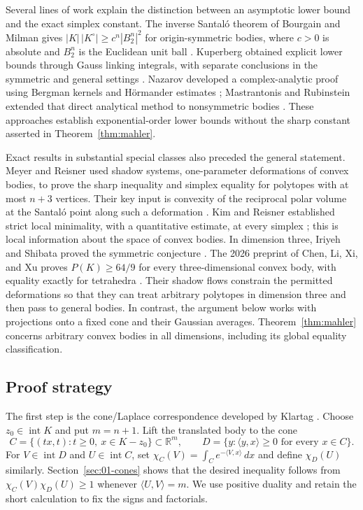 Several lines of work explain the distinction between an asymptotic lower
bound and the exact simplex constant. The inverse Santal\'o theorem of
Bourgain and Milman gives
$|K|\,|K^\circ|\ge c^n|B_2^n|^2$ for origin-symmetric bodies, where $c>0$ is
absolute and $B_2^n$ is the Euclidean unit ball
\cite{BourgainMilman1987}. Kuperberg obtained explicit lower bounds through
Gauss linking integrals, with separate conclusions in the symmetric and
general settings \cite{Kuperberg2008}. Nazarov developed a complex-analytic
proof using Bergman kernels and H\"ormander estimates
\cite{Nazarov2012}; Mastrantonis and Rubinstein extended that direct
analytical method to nonsymmetric bodies \cite{MastrantonisRubinstein2024}.
These approaches establish exponential-order lower bounds without the
sharp constant asserted in Theorem~\ref{thm:mahler}.

Exact results in substantial special classes also preceded the general
statement. Meyer and Reisner used shadow systems, one-parameter
deformations of convex bodies, to prove the sharp inequality and simplex
equality for polytopes with at most $n+3$ vertices. Their key input is
convexity of the reciprocal polar volume at the Santal\'o point along
such a deformation \cite[Theorems~1 and~10]{MeyerReisner2006}.
Kim and Reisner established strict
local minimality, with a quantitative estimate, at every simplex
\cite[Theorem~1]{KimReisner2011}; this is local information about the
space of convex bodies. In dimension three, Iriyeh and Shibata proved the
symmetric conjecture \cite{IriyehShibata2020}. The 2026 preprint of Chen,
Li, Xi, and Xu proves $P(K)\ge64/9$ for every three-dimensional
convex body, with equality exactly for tetrahedra
\cite{ChenLiXiXu2026}. Their shadow flows constrain the permitted
deformations so that they can treat arbitrary polytopes in dimension
three and then pass to general bodies. In contrast, the argument below
works with projections onto a fixed cone and their Gaussian averages.
Theorem~\ref{thm:mahler} concerns arbitrary convex bodies in all
dimensions, including its global equality classification.

\subsection*{Proof strategy}
The first step is the cone/Laplace correspondence developed by Klartag
\cite[Lemma~2.1 and Corollary~4.1]{Klartag2018}. Choose
$z_0\in\operatorname{int}K$ and put $m=n+1$. Lift the translated body
to the cone
\[
 C=\{(tx,t):t\ge0,\ x\in K-z_0\}\subset\mathbb R^m,
 \qquad D=\{y:\langle y,x\rangle\ge0\text{ for every }x\in C\}.
\]
For $V\in\operatorname{int}D$ and $U\in\operatorname{int}C$, set
$\chi_C(V)=\int_Ce^{-\langle V,x\rangle}\,dx$ and define $\chi_D(U)$
similarly. Section~\ref{sec:01-cones} shows that the desired inequality
follows from $\chi_C(V)\chi_D(U)\ge1$ whenever
$\langle U,V\rangle=m$. We use positive duality and retain the short
calculation to fix the signs and factorials.

